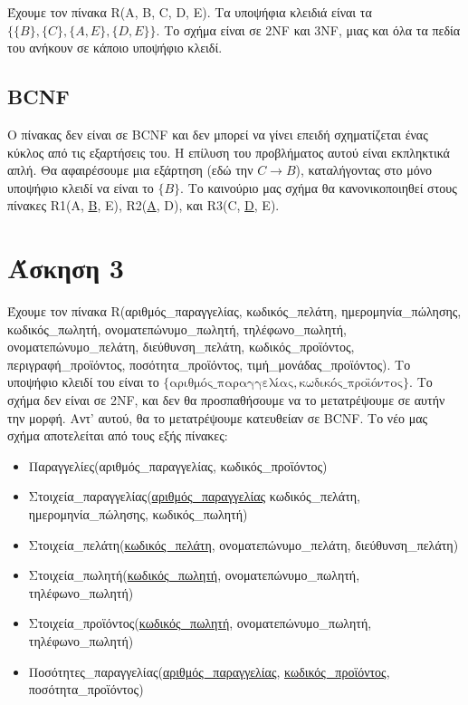 \documentclass{article}
\begin{document}
Έχουμε τον πίνακα R(A, B, C, D, E). Τα υποψήφια κλειδιά είναι τα $\{\{B\}, \{C\}, \{A, E\}, \{D, E\}\}$. Το σχήμα είναι σε 2NF και 3NF, μιας και όλα τα πεδία του ανήκουν σε κάποιο υποψήφιο κλειδί.

\subsection*{BCNF}

Ο πίνακας δεν είναι σε BCNF και δεν μπορεί να γίνει επειδή σχηματίζεται ένας κύκλος από τις εξαρτήσεις του. Η επίλυση του προβλήματος αυτού είναι εκπληκτικά απλή. Θα αφαιρέσουμε μια εξάρτηση (εδώ την $C \rightarrow B$), καταλήγοντας στο μόνο υποψήφιο κλειδί να είναι το $\{B\}$. Το καινούριο μας σχήμα θα κανονικοποιηθεί στους πίνακες R1(A, \underline{B}, E), R2(\underline{A}, D), και R3(C, \underline{D}, \underline{}{E}).

\section*{Άσκηση 3}

Έχουμε τον πίνακα R(αριθμός\_παραγγελίας, κωδικός\_πελάτη, ημερομηνία\_πώλησης, κωδικός\_πωλητή, ονοματεπώνυμο\_πωλητή, τηλέφωνο\_πωλητή, ονοματεπώνυμο\_πελάτη, διεύθυνση\_πελάτη, κωδικός\_προϊόντος, περιγραφή\_προϊόντος, ποσότητα\_προϊόντος, τιμή\_μονάδας\_προϊόντος). Το υποψήφιο κλειδί του είναι το $\{\text{αριθμός\_παραγγελίας}, \text{κωδικός\_προϊόντος}\}$. Το σχήμα δεν είναι σε 2NF, και δεν θα προσπαθήσουμε να το μετατρέψουμε σε αυτήν την μορφή. Αντ' αυτού, θα το μετατρέψουμε κατευθείαν σε BCNF. Το νέο μας σχήμα αποτελείται από τους εξής πίνακες:

\begin{itemize}
    \item Παραγγελίες(αριθμός\_παραγγελίας, κωδικός\_προϊόντος)
    \item Στοιχεία\_παραγγελίας(\underline{αριθμός\_παραγγελίας} κωδικός\_πελάτη, ημερομηνία\_πώλησης, κωδικός\_πωλητή)
    \item Στοιχεία\_πελάτη(\underline{κωδικός\_πελάτη}, ονοματεπώνυμο\_πελάτη, διεύθυνση\_πελάτη)
    \item Στοιχεία\_πωλητή(\underline{κωδικός\_πωλητή}, ονοματεπώνυμο\_πωλητή, τηλέφωνο\_πωλητή)
    \item Στοιχεία\_προϊόντος(\underline{κωδικός\_πωλητή}, ονοματεπώνυμο\_πωλητή, τηλέφωνο\_πωλητή)
    \item Ποσότητες\_παραγγελίας(\underline{αριθμός\_παραγγελίας}, \underline{κωδικός\_προϊόντος}, ποσότητα\_προϊόντος)
\end{itemize}
\end{document}
